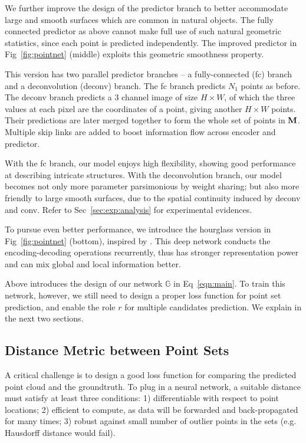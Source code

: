 We further improve the design of the predictor branch to better accommodate large and smooth surfaces which are common in natural objects. The fully connected predictor as above cannot make full use of such natural geometric statistics, since each point is predicted independently. The improved predictor in Fig~\ref{fig:pointnet} (middle) exploits this geometric smoothness property. 

This version has two parallel predictor branches -- a fully-connected (fc) branch and a deconvolution (deconv) branch. The fc branch predicts $N_1$ points as before. The deconv branch predicts a 3 channel image of size $H\times W$, of which the three values at each pixel are the coordinates of a point, giving another $H\times W$ points. Their predictions are later merged together to form the whole set of points in ${\bf M}$. Multiple skip links are added to boost information flow across encoder and predictor. 

With the fc branch, our model enjoys high flexibility, showing good performance at describing intricate structures. With the deconvolution branch, our model becomes not only more parameter parsimonious by weight sharing; but also more friendly to large smooth surfaces, due to the spatial continuity induced by deconv and conv. Refer to Sec~\ref{sec:exp:analysis} for experimental evidences. 

To pursue even better performance, we introduce the hourglass version in Fig~\ref{fig:pointnet} (bottom), inspired by \cite{newell2016stacked}. This deep network conducts the encoding-decoding operations recurrently, thus has stronger representation power and can mix global and local information better. 

Above introduces the design of our network $\mathbb{G}$ in Eq~\ref{eqn:main}. To train this network, however, we still need to design a proper loss function for point set prediction, and enable the role $r$ for multiple candidates prediction. We explain in the next two sections.
\subsection{Distance Metric between Point Sets}
\label{sec:method:loss}



A critical challenge is to design a good loss function for comparing the predicted point cloud and the groundtruth. To plug in a neural network, a suitable distance must satisfy at least three conditions: 1) differentiable with respect to point locations; 2) efficient to compute, as data will be forwarded and back-propagated for many times; 3) robust against small number of outlier points in the sets (e.g. Hausdorff distance would fail).


